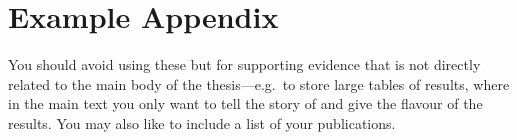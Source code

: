 \documentclass[iwp,first]{luthesis}
\begin{document}

\cleardoublepage
{}
{}


\backmatter
\appendix
\chapter{Example Appendix}

You should avoid using these but for supporting evidence that is not directly related to the main body of the thesis---e.g.\ to store large tables of results, where in the main text you only want to tell the story of and give the flavour of the results.  You may also like to include a list of your publications.
\end{document}
